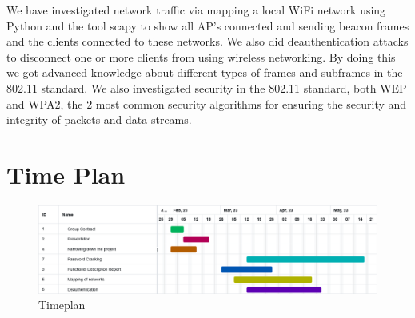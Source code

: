 We have investigated network traffic via mapping a local WiFi network using Python and the tool scapy to show all AP's connected and sending beacon frames and the clients connected to these networks. We also did deauthentication attacks to disconnect one or more clients from using wireless networking. By doing this we got advanced knowledge about different types of frames and subframes in the 802.11 standard. We also investigated security in the 802.11 standard, both WEP and WPA2, the 2 most common security algorithms for ensuring the security and integrity of packets and data-streams. 

\newpage
\section{Time Plan}
\begin{figure}[!htbp]
    \centering
    \includegraphics[width=1\textwidth]{Latex-Files/Billeder/Timeplan.png}
    \caption{Timeplan}
\end{figure}
